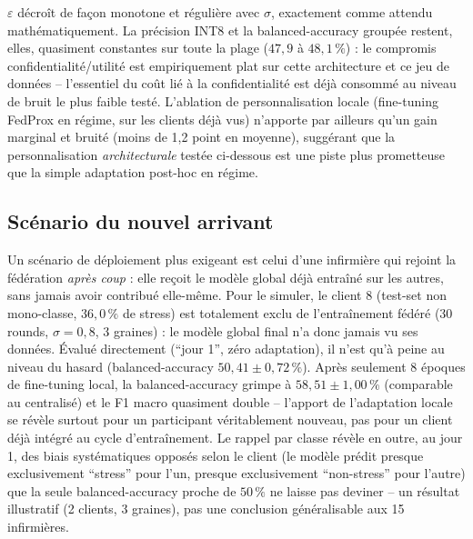 \documentclass{acmart}
\begin{document}
$\varepsilon$ décroît de façon monotone et régulière avec $\sigma$, exactement comme
attendu mathématiquement. La précision INT8 et la balanced-accuracy groupée restent,
elles, quasiment constantes sur toute la plage ($47{,}9$ à $48{,}1\,\%$) : le compromis
confidentialité/utilité est empiriquement plat sur cette architecture et ce jeu de
données -- l'essentiel du coût lié à la confidentialité est déjà consommé au niveau de
bruit le plus faible testé. L'ablation de personnalisation locale (fine-tuning FedProx
en régime, sur les clients déjà vus) n'apporte par ailleurs qu'un gain marginal et
bruité (moins de 1,2 point en moyenne), suggérant que la personnalisation
\emph{architecturale} testée ci-dessous est une piste plus prometteuse que la simple
adaptation post-hoc en régime.

\subsection{Scénario du nouvel arrivant}

Un scénario de déploiement plus exigeant est celui d'une infirmière qui rejoint la
fédération \emph{après coup} : elle reçoit le modèle global déjà entraîné sur les
autres, sans jamais avoir contribué elle-même. Pour le simuler, le client 8 (test-set
non mono-classe, $36{,}0\,\%$ de stress) est totalement exclu de l'entraînement fédéré
(30 rounds, $\sigma=0{,}8$, 3 graines) : le modèle global final n'a donc jamais vu ses
données. Évalué directement (``jour 1'', zéro adaptation), il n'est qu'à peine au
niveau du hasard (balanced-accuracy $50{,}41\pm0{,}72\,\%$). Après seulement 8 époques
de fine-tuning local, la balanced-accuracy grimpe à $58{,}51\pm1{,}00\,\%$ (comparable
au centralisé) et le F1 macro quasiment double -- l'apport de l'adaptation locale se
révèle surtout pour un participant véritablement nouveau, pas pour un client déjà
intégré au cycle d'entraînement. Le rappel par classe révèle en outre, au jour 1, des
biais systématiques opposés selon le client (le modèle prédit presque exclusivement
``stress'' pour l'un, presque exclusivement ``non-stress'' pour l'autre) que la seule
balanced-accuracy proche de $50\,\%$ ne laisse pas deviner -- un résultat illustratif
(2 clients, 3 graines), pas une conclusion généralisable aux 15 infirmières.
\end{document}

